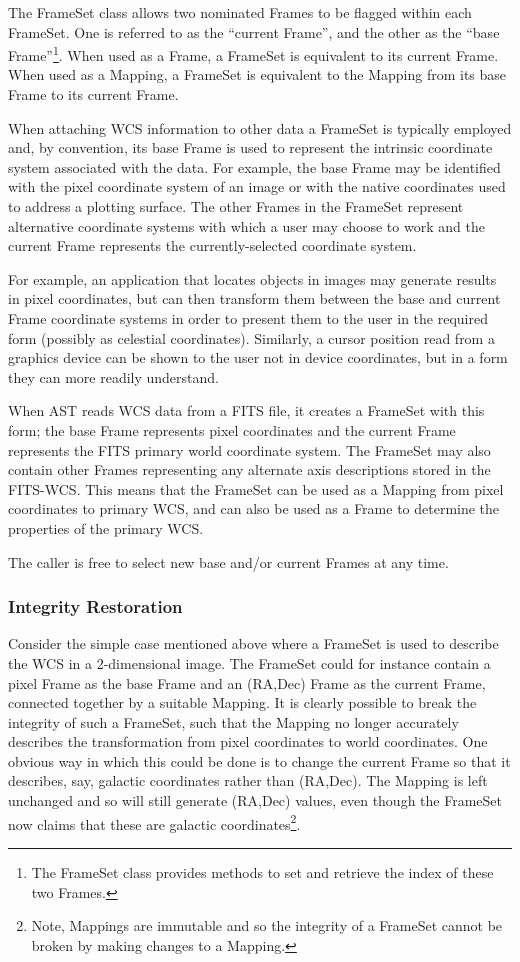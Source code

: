 \documentclass[final,authoryear,5p,times,twocolumn]{elsarticle}
\begin{document}
The FrameSet class allows two nominated Frames to be flagged within each
FrameSet. One is referred to as the ``current Frame'', and the other as
the ``base Frame''\footnote{The FrameSet class provides methods to set
and retrieve the index of these two Frames.}. When used as a Frame, a
FrameSet is equivalent to its current Frame. When used as a Mapping, a
FrameSet is equivalent to the Mapping from its base Frame to its current
Frame.

When attaching WCS information to other data a FrameSet is typically
employed and, by convention, its base Frame is used to represent the
intrinsic coordinate system associated with the data. For example, the
base Frame may be identified with the pixel coordinate system of an image
or with the native coordinates used to address a plotting surface. The
other Frames in the FrameSet represent alternative coordinate systems
with which a user may choose to work and the current Frame represents the
currently-selected coordinate system.

For example, an application that locates objects in images may generate
results in pixel coordinates, but can then transform them between the
base and current Frame coordinate systems in order to present them to the
user in the required form (possibly as celestial coordinates). Similarly,
a cursor position read from a graphics device can be shown to the user
not in device coordinates, but in a form they can more readily
understand.

When AST reads WCS data from a FITS file, it creates a FrameSet with this
form; the base Frame represents pixel coordinates and the current Frame
represents the FITS primary world coordinate system. The FrameSet may
also contain other Frames representing any alternate axis descriptions
stored in the FITS-WCS. This means that the FrameSet can be used as a
Mapping from pixel coordinates to primary WCS, and can also be used as a
Frame to determine the properties of the primary WCS.

The caller is free to select new base and/or current Frames at any time.

\subsubsection{Integrity Restoration}
\label{sec:integrity}
Consider the simple case mentioned above where a FrameSet is used to
describe the WCS in a 2-dimensional image. The FrameSet could for
instance contain a pixel Frame as the base Frame and an (RA,Dec) Frame as
the current Frame, connected together by a suitable Mapping. It is
clearly possible to break the integrity of such a FrameSet, such that the
Mapping no longer accurately describes the transformation from pixel
coordinates to world coordinates. One obvious way in which this could be
done is to change the current Frame so that it describes, say, galactic
coordinates rather than (RA,Dec). The Mapping is left unchanged and so will
still generate (RA,Dec) values, even though the FrameSet now claims that
these are galactic coordinates\footnote{Note, Mappings are immutable and so the
integrity of a FrameSet cannot be broken by making changes to a Mapping.}.
\end{document}
